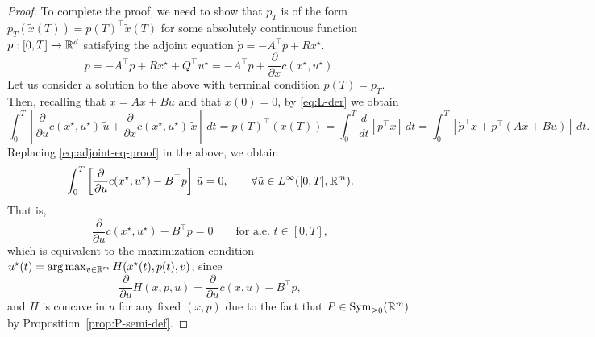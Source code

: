\begin{proof}
    To complete the proof, we need to show that $p_T$ is of the form $p_T(\tilde x(T)) = p(T)^\top \tilde x(T)$ for some absolutely continuous function $p:[0,T]\to \mathbb{R}^d$ satisfying the adjoint equation $\dot p = -A^\top p + Rx^\star$.
    \begin{equation}
        \label{eq:adjoint-eq-proof}
        \dot p =-A^\top p + Rx^\star + Q^\top u^\star =  -A^\top p + \frac{\partial}{\partial x}c(x^\star, u^\star).
    \end{equation}
    Let us consider a solution to the above with terminal condition $p(T)=p_T$.
    Then, recalling that $\tilde x = A\tilde x + B \tilde u$ and that $\tilde x(0)=0$, by \eqref{eq:L-der} we obtain
    \begin{equation}
       \int_0^T \left[ \frac{\partial}{\partial u} c(x^\star, u^\star) \, \tilde u + \frac{\partial}{\partial x}c(x^\star, u^\star) \, \tilde x  \right] \, dt 
       = p(T)^\top (x(T)) 
       = \int_0^T \frac{d}{dt} \left[p^\top x\right]\, dt 
       = \int_0^T \left[ \dot p^\top x + p^\top (Ax + Bu) \right]\, dt.
    \end{equation}
    Replacing \eqref{eq:adjoint-eq-proof} in the above, we obtain 
    \begin{equation}
        \int_0^T \left[\frac{\partial}{\partial u} c(x^\star, u^\star) - B^\top p \right]\, \tilde u = 0, \qquad \forall \tilde u\in L^\infty([0,T],\mathbb{R}^m). 
    \end{equation} 
    That is, 
    \begin{equation}
       \frac{\partial}{\partial u} c(x^\star, u^\star) - B^\top p = 0 \qquad \text{for a.e.\ } t\in [0,T],  
    \end{equation}
    which is equivalent to the maximization condition $u^\star(t) = \arg\max_{v\in \mathbb{R}^m} H(x^\star(t),p(t),v)$, since
    \begin{equation}
        \frac{\partial}{\partial u} H(x,p,u) = \frac{\partial}{\partial u} c(x,u) - B^\top p,
    \end{equation}
    and $H$ is concave in $u$ for any fixed $(x,p)$ due to the fact that $P\in \operatorname{Sym}_{\ge0}(\mathbb{R}^m)$ by Proposition~\ref{prop:P-semi-def}.
\end{proof}



